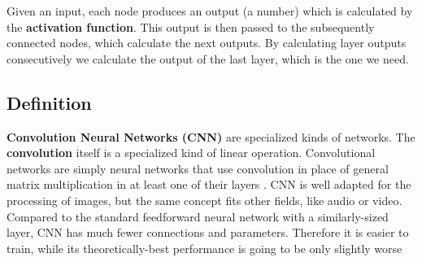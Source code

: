 \documentclass[../Main.tex]{subfiles}
\begin{document}
    Given an input, each node produces an output (a number) which is calculated by the \textbf{activation function}. This output is then passed to the subsequently connected nodes, which calculate the next outputs. By calculating layer outputs consecutively we calculate the output of the last layer, which is the one we need.
    
    \subsection{Definition}
    \textbf{Convolution Neural Networks (CNN)} are specialized kinds of networks. The \textbf{convolution} itself is a specialized kind of linear operation. Convolutional networks are simply neural networks that use convolution in place of general matrix multiplication in at least one of their layers \cite{Goodfellow-et-al-2016}.  CNN is well adapted for the processing of images, but the same concept fits other fields, like audio or video. 
    Compared to the standard feedforward neural network with a similarly-sized layer, CNN has much fewer connections and parameters. Therefore it is easier to train, while its theoretically-best performance is going to be only slightly worse 
        
\end{document}
